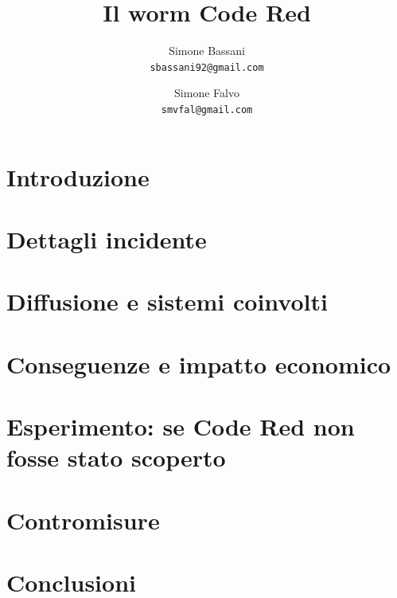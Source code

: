\documentclass[a4paper,titlepage]{article}
\begin{document}
\title{
Il worm Code Red
}
\author{
  Simone Bassani\\
  \texttt{sbassani92@gmail.com}
  \and
  Simone Falvo\\
  \texttt{smvfal@gmail.com}
}

\date{}


\maketitle

%

\tableofcontents
\newpage

\section{Introduzione}
%

\section{Dettagli incidente}

\section{Diffusione e sistemi coinvolti}


\section{Conseguenze e impatto economico}


\section{Esperimento: se Code Red non fosse stato scoperto}


\section{Contromisure}

\section{Conclusioni}


\end{document}
